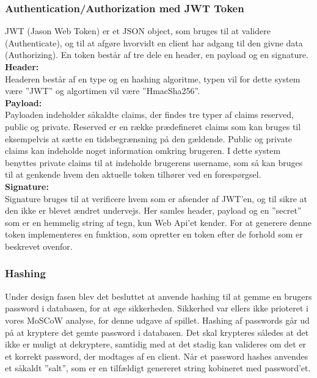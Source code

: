 \subsubsection{Authentication/Authorization med JWT Token}
JWT (Jason Web Token) er et JSON object, som bruges til at validere (Authenticate), og til at afgøre hvorvidt en client har adgang til den givne data (Authorizing). En token består af tre dele en header, en payload og en signature.\\

\textbf{Header:}\\
Headeren består af en type og en hashing algoritme, typen vil for dette system være ”JWT” og algortimen vil være ”HmacSha256”.\\

\textbf{Payload:}\\

Payloaden indeholder såkaldte claims, der findes tre typer af claims reserved, public og private. Reserved er en række prædefineret claims som kan bruges til eksempelvis at sætte en tidsbegrænsning på den gældende. Public og private claims kan indeholde noget information omkring brugeren. I dette system benyttes private claims til at indeholde brugerens username, som så kan bruges til at genkende hvem den aktuelle token tilhører ved en forespørgsel.\\

\textbf{Signature:}\\
Signature bruges til at verificere hvem som er afsender af JWT’en, og til sikre at den ikke er blevet ændret undervejs. Her samles header, payload og en ”secret” som er en hemmelig string af tegn, kun Web Api'et kender.
For at generere denne token implementeres en funktion, som opretter en token efter de forhold som er beskrevet ovenfor.\\


\subsubsection{Hashing}
Under design fasen blev det besluttet at anvende hashing til at gemme en brugers password i databasen, for at øge sikkerheden. Sikkerhed var ellers ikke prioteret i vores MoSCoW analyse, for denne udgave af spillet.
Hashing af passwords går ud på at kryptere det gemte password i databasen. Det skal krypteres således at det ikke er muligt at dekryptere, samtidig med at det stadig kan valideres om det er et korrekt password, der modtages af en client. Når et password hashes anvendes et såkaldt ”salt”, som er en tilfældigt genereret string kobineret med password’et.\\

